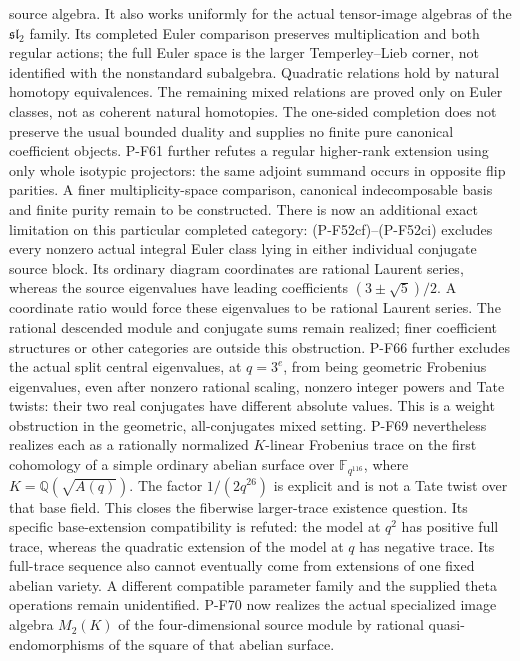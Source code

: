 \begin{description}
source algebra.  It also works uniformly for the actual tensor-image
algebras of the $\mathfrak{sl}_2$ family.  Its completed Euler
comparison preserves multiplication and both regular actions;
the full Euler space is the larger Temperley--Lieb corner, not
identified with the nonstandard subalgebra.  Quadratic relations
hold by natural homotopy equivalences.  The remaining mixed
relations are proved only on Euler classes, not as coherent natural
homotopies.  The one-sided completion does not preserve the usual
bounded duality and supplies no finite pure canonical coefficient
objects.  P-F61 further refutes a regular higher-rank extension
using only whole isotypic projectors: the same adjoint summand
occurs in opposite flip parities.  A finer multiplicity-space
comparison, canonical indecomposable basis and finite purity
remain to be constructed.
There is now an additional exact limitation on this particular
completed category: (P-F52cf)--(P-F52ci) excludes every nonzero
actual integral Euler class lying in either individual conjugate
source block.  Its ordinary diagram coordinates are rational Laurent
series, whereas the source eigenvalues have leading coefficients
$(3\pm\sqrt5)/2$.  A coordinate ratio would force these eigenvalues
to be rational Laurent series.  The rational descended module and
conjugate sums remain realized; finer coefficient structures or
other categories are outside this obstruction.
P-F66 further excludes the actual split central eigenvalues, at
$q=3^e$, from being geometric Frobenius eigenvalues, even after
nonzero rational scaling, nonzero integer powers and Tate twists:
their two real conjugates have different absolute values.
This is a weight obstruction in the geometric, all-conjugates
mixed setting.  P-F69 nevertheless realizes each as a rationally
normalized $K$-linear Frobenius trace on the first cohomology of
a simple ordinary abelian surface over $\mathbb F_{q^{116}}$,
where $K=\mathbb Q(\sqrt{A(q)})$.  The factor $1/(2q^{26})$
is explicit and is not a Tate twist over that base field.
This closes the fiberwise larger-trace existence question.
Its specific base-extension compatibility is refuted: the model
at $q^2$ has positive full trace, whereas the quadratic extension
of the model at $q$ has negative trace.  Its full-trace sequence
also cannot eventually come from extensions of one fixed abelian
variety.  A different compatible parameter family and the
supplied theta operations remain unidentified.
P-F70 now realizes the actual specialized image algebra
$M_2(K)$ of the four-dimensional source module by rational
quasi-endomorphisms of the square of that abelian surface.

\end{description}
